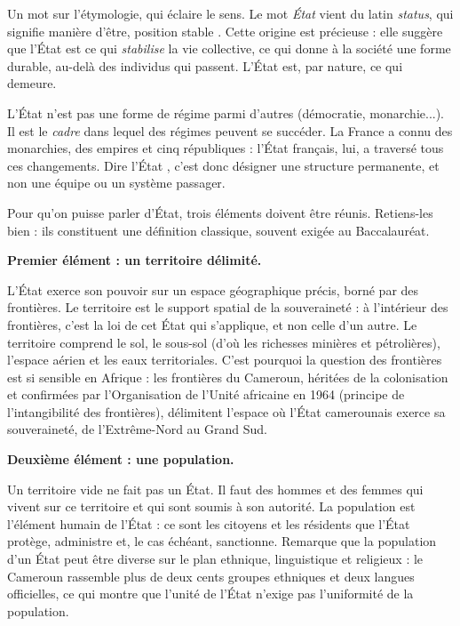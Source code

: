 \documentclass[11pt]{article}
\newcounter{popsec}
\newcounter{popsub}
\newcommand{\courssub}[1]{%
  \stepcounter{popsub}%
  \par\vspace{9pt}\noindent{\popxbold\fontsize{11.5}{13}\selectfont\color{popink}{\color{poporange}\thepopsec.\thepopsub}\hspace{6pt}#1}\par\nopagebreak\vspace{4pt}
}
\begin{document}
Un mot sur l'étymologie, qui éclaire le sens. Le mot \emph{État} vient du latin \emph{status}, qui signifie \guillemotleft manière d'être, position stable \guillemotright. Cette origine est précieuse : elle suggère que l'État est ce qui \emph{stabilise} la vie collective, ce qui donne à la société une forme durable, au-delà des individus qui passent. L'État est, par nature, ce qui demeure.

\begin{attention}
L'État n'est pas une forme de régime parmi d'autres (démocratie, monarchie...). Il est le \emph{cadre} dans lequel des régimes peuvent se succéder. La France a connu des monarchies, des empires et cinq républiques : l'État français, lui, a traversé tous ces changements. Dire \guillemotleft l'État \guillemotright, c'est donc désigner une structure permanente, et non une équipe ou un système passager.
\end{attention}

\courssub{Les trois éléments constitutifs de l'État}

Pour qu'on puisse parler d'État, trois éléments doivent être réunis. Retiens-les bien : ils constituent une définition classique, souvent exigée au Baccalauréat.

\textbf{Premier élément : un territoire délimité.}\par
L'État exerce son pouvoir sur un espace géographique précis, borné par des frontières. Le territoire est le support spatial de la souveraineté : à l'intérieur des frontières, c'est la loi de cet État qui s'applique, et non celle d'un autre. Le territoire comprend le sol, le sous-sol (d'où les richesses minières et pétrolières), l'espace aérien et les eaux territoriales. C'est pourquoi la question des frontières est si sensible en Afrique : les frontières du Cameroun, héritées de la colonisation et confirmées par l'Organisation de l'Unité africaine en 1964 (principe de l'intangibilité des frontières), délimitent l'espace où l'État camerounais exerce sa souveraineté, de l'Extrême-Nord au Grand Sud.

\textbf{Deuxième élément : une population.}\par
Un territoire vide ne fait pas un État. Il faut des hommes et des femmes qui vivent sur ce territoire et qui sont soumis à son autorité. La population est l'élément humain de l'État : ce sont les citoyens et les résidents que l'État protège, administre et, le cas échéant, sanctionne. Remarque que la population d'un État peut être diverse sur le plan ethnique, linguistique et religieux : le Cameroun rassemble plus de deux cents groupes ethniques et deux langues officielles, ce qui montre que l'unité de l'État n'exige pas l'uniformité de la population.
\end{document}
